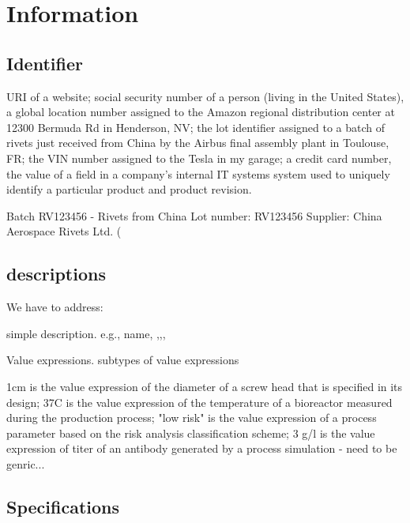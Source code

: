\chapter{Information}

\section{Identifier}

URI of a website; social security number of a person (living in the United States), a global location number assigned to the Amazon regional distribution center at 12300 Bermuda Rd in Henderson, NV; the lot identifier assigned to a batch of rivets just received from China by the Airbus final assembly plant in Toulouse, FR; the VIN number assigned to the Tesla in my garage; a credit card number, the value of a field in a company's internal IT systems system used to uniquely identify a particular product and product revision.

Batch RV123456 - Rivets from China Lot number: RV123456
Supplier: China Aerospace Rivets Ltd. (

\section{descriptions}

We have to address:

simple description. e.g., name, ,,,

Value expressions. subtypes of value expressions

1cm is the value expression of the diameter of a screw head that is specified in its design; 37C is the value expression of the temperature of a bioreactor measured during the production process; "low risk" is the value expression of a process parameter based on the risk analysis classification scheme; 3 g/l is the value expression of titer of an antibody generated by a process simulation - need to be genric...


\section{Specifications}